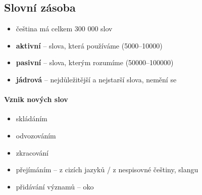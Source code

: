 \subsection{Slovní zásoba}
\begin{itemize}
\item čeština má celkem 300 000 slov
\item \textbf{aktivní} -- slova, která používáme (5000--10000)
\item \textbf{pasivní} -- slova, kterým rozumíme (50000--100000)
\item \textbf{jádrová} -- nejdůležitější a nejstarší slova, nemění se
\end{itemize}

\paragraph{Vznik nových slov}
\begin{itemize}
\item skládáním
\item odvozováním
\item zkracování
\item přejímáním -- z cizích jazyků / z nespisovné češtiny, slangu
\item přidávání významů -- oko
\end{itemize}

